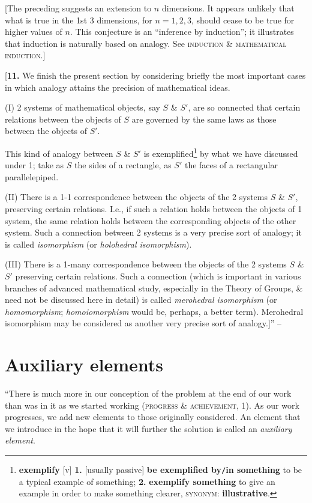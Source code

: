 \documentclass[oneside]{book}
\numberwithin{equation}{section}
\begin{document}
[The preceding suggests an extension to $n$ dimensions. It appears unlikely that what is true in the 1st 3 dimensions, for $n = 1,2,3$, should cease to be true for higher values of $n$. This conjecture is an ``inference by induction''; it illustrates that induction is naturally based on analogy. See \textsc{induction \& mathematical induction}.]

[\textbf{11.} We finish the present section by considering briefly the most important cases in which analogy attains the precision of mathematical ideas.

(I) 2 systems of mathematical objects, say $S$ \& $S'$, are so connected that certain relations between the objects of $S$ are governed by the same laws as those between the objects of $S'$.

This kind of analogy between $S$ \& $S'$ is exemplified\footnote{\textbf{exemplify} [v] \textbf{1.} [usually passive] \textbf{be exemplified by\texttt{/}in something} to be a typical example of something; \textbf{2.} \textbf{exemplify something} to give an example in order to make something clearer, \textsc{synonym}: \textbf{illustrative}.} by what we have discussed under 1; take as $S$ the sides of a rectangle, as $S'$ the faces of a rectangular parallelepiped.

(II) There is a 1-1 correspondence between the objects of the 2 systems $S$ \& $S'$, preserving certain relations. I.e., if such a relation holds between the objects of 1 system, the same relation holds between the corresponding objects of the other system. Such a connection between 2 systems is a very precise sort of analogy; it is called \textit{isomorphism} (or \textit{holohedral isomorphism}).

(III) There is a 1-many correspondence between the objects of the 2 systems $S$ \& $S'$ preserving certain relations. Such a connection (which is important in various branches of advanced mathematical study, especially in the Theory of Groups, \& need not be discussed here in detail) is called \textit{merohedral isomorphism} (or \textit{homomorphism}; \textit{homoiomorphism} would be, perhaps, a better term). Merohedral isomorphism may be considered as another very precise sort of analogy.]'' -- \cite[pp. 37--46]{Polya2014}

\section{Auxiliary elements}
``There is much more in our conception of the problem at the end of our work than was in it as we started working (\textsc{progress \& achievement, 1}). As our work progresses, we add new elements to those originally considered. An element that we introduce in the hope that it will further the solution is called an \textit{auxiliary element}.
\end{document}
